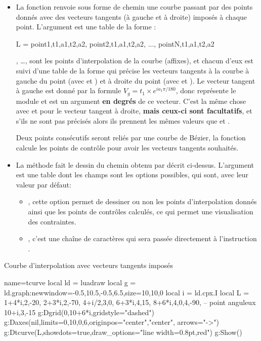 \begin{itemize}
\item La fonction  renvoie sous forme de chemin une courbe passant par des points donnés avec des vecteurs tangents (à gauche et à droite) imposés à chaque point. L'argument  est une table de la forme :
\begin{Luacode}
L = {point1,{t1,a1,t2,a2}, point2,{t1,a1,t2,a2}, ..., pointN,{t1,a1,t2,a2}}
\end{Luacode}
, \ldots,  sont les points d'interpolation de la courbe (affixes), et chacun d'eux est suivi d'une table de la forme  qui précise les vecteurs tangents à la courbe à gauche du point (avec  et ) et à droite du point (avec  et ). Le vecteur tangent à gauche est donné par la formule $V_g = t_1\times e^{ia_1\pi/180}$, donc  représente le module et  est un argument \textbf{en degrés} de ce vecteur. C'est la même chose avec  et  pour le vecteur tangent à droite, \textbf{mais ceux-ci sont facultatifs}, et s'ils ne sont pas précisés alors ils prennent les mêmes valeurs que  et .

Deux points consécutifs seront reliés par une courbe de Bézier, la fonction calcule les points de contrôle pour avoir les vecteurs tangents souhaités.

\item La méthode  fait le dessin du chemin obtenu par  décrit ci-dessus. L'argument  est une table dont les champs sont les options possibles, qui sont, avec leur valeur par défaut:
    \begin{itemize}
        \item {}, cette option permet de dessiner ou non les points d'interpolation donnés ainsi que les points de contrôles calculés, ce qui permet une visualisation des contraintes.
        \item {}, c'est une chaîne de caractères qui sera passée directement à l'instruction \drawcmd.
    \end{itemize}
\end{itemize}

\begin{demo}{Courbe d'interpolation avec vecteurs tangents imposés}
\begin{luadraw}{name=tcurve}
local ld = luadraw
local g = ld.graph:new{window={-0.5,10.5,-0.5,6.5},size={10,10,0}}
local i = ld.cpx.I
local L = {
1+4*i,{2,-20},
2+3*i,{2,-70},
4+i/2,{3,0},
6+3*i,{4,15},
8+6*i,{4,0,4,-90}, -- point anguleux
10+i,{3,-15}}
g:Dgrid({0,10+6*i},{gridstyle="dashed"})
g:Daxes(nil,{limits={{0,10},{0,6}},originpos={"center","center"}, arrows="->"})
g:Dtcurve(L,{showdots=true,draw_options="line width=0.8pt,red"})
g:Show()
\end{luadraw}
\end{demo}

